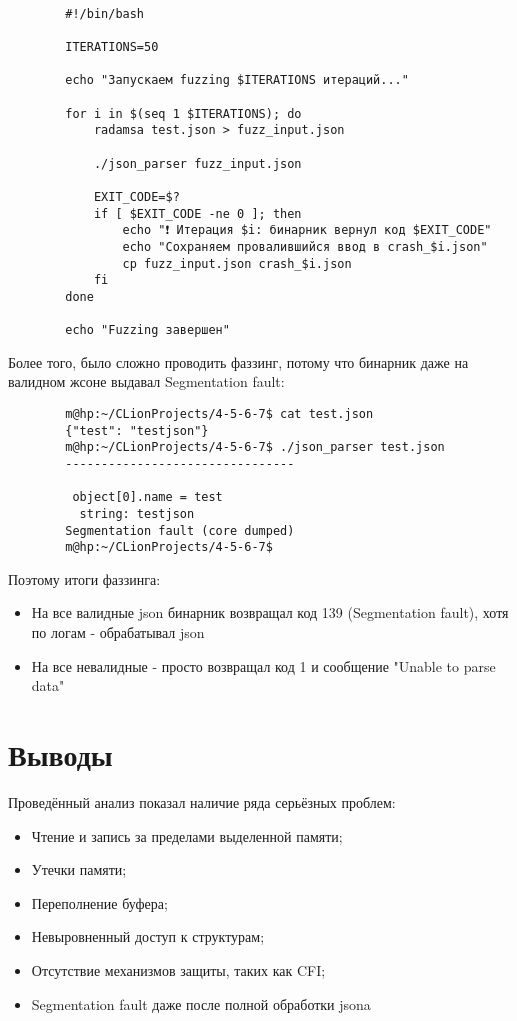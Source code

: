     \begin{verbatim}

        #!/bin/bash

        ITERATIONS=50

        echo "Запускаем fuzzing $ITERATIONS итераций..."

        for i in $(seq 1 $ITERATIONS); do
            radamsa test.json > fuzz_input.json

            ./json_parser fuzz_input.json

            EXIT_CODE=$?
            if [ $EXIT_CODE -ne 0 ]; then
                echo "❗ Итерация $i: бинарник вернул код $EXIT_CODE"
                echo "Сохраняем провалившийся ввод в crash_$i.json"
                cp fuzz_input.json crash_$i.json
            fi
        done

        echo "Fuzzing завершен"
    \end{verbatim}

    Более того, было сложно проводить фаззинг, потому что бинарник даже на валидном жсоне выдавал Segmentation fault:
    \begin{verbatim}
        m@hp:~/CLionProjects/4-5-6-7$ cat test.json
        {"test": "testjson"}
        m@hp:~/CLionProjects/4-5-6-7$ ./json_parser test.json
        --------------------------------

         object[0].name = test
          string: testjson
        Segmentation fault (core dumped)
        m@hp:~/CLionProjects/4-5-6-7$
    \end{verbatim}

    Поэтому итоги фаззинга:
    \begin{itemize}
        \item На все валидные json бинарник возвращал код 139 (Segmentation fault), хотя по логам - обрабатывал json
        \item На все невалидные - просто возвращал код 1 и сообщение "Unable to parse data"
    \end{itemize}


    \section{Выводы}

    Проведённый анализ показал наличие ряда серьёзных проблем:
    \begin{itemize}
        \item Чтение и запись за пределами выделенной памяти;
        \item Утечки памяти;
        \item Переполнение буфера;
        \item Невыровненный доступ к структурам;
        \item Отсутствие механизмов защиты, таких как CFI;
        \item Segmentation fault даже после полной обработки jsona
    \end{itemize}


